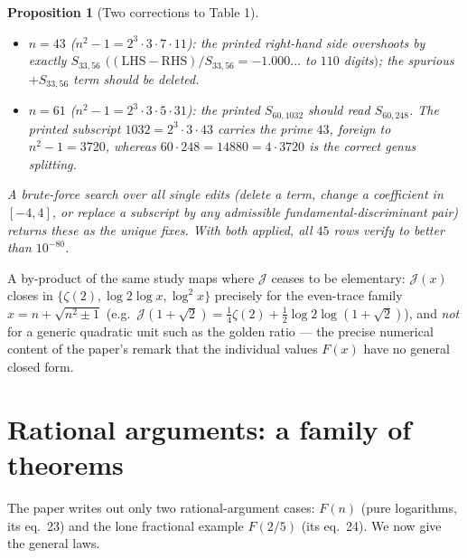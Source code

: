\documentclass[11pt]{article}
\newcommand{\Jcal}{\mathcal{J}}
\theoremstyle{plain}\newtheorem{theorem}{Theorem}\newtheorem{proposition}[theorem]{Proposition}
\theoremstyle{remark}\newtheorem{remark}[theorem]{Remark}
\begin{document}
\begin{proposition}[Two corrections to Table 1]
\leavevmode
\begin{itemize}[topsep=2pt,itemsep=1pt]
\item $n=43$ ($n^2-1=2^3\cdot3\cdot7\cdot11$): the printed right-hand side overshoots by exactly $S_{33,56}$
$\bigl((\text{LHS}-\text{RHS})/S_{33,56}=-1.000\ldots$ to $110$ digits$\bigr)$; the spurious $+S_{33,56}$
term should be deleted.
\item $n=61$ ($n^2-1=2^3\cdot3\cdot5\cdot31$): the printed $S_{60,1032}$ should read $S_{60,248}$. The
printed subscript $1032=2^3\cdot3\cdot43$ carries the prime $43$, foreign to $n^2-1=3720$, whereas
$60\cdot248=14880=4\cdot3720$ is the correct genus splitting.
\end{itemize}
A brute-force search over all single edits (delete a term, change a coefficient in $[-4,4]$, or replace a
subscript by any admissible fundamental-discriminant pair) returns these as the \emph{unique} fixes. With
both applied, all $45$ rows verify to better than $10^{-80}$.
\end{proposition}

\noindent A by-product of the same study maps where $\Jcal$ ceases to be elementary: $\Jcal(x)$ closes in
$\{\zeta(2),\log2\log x,\log^2 x\}$ precisely for the even-trace family $x=n+\sqrt{n^2\pm1}$
(e.g.\ $\Jcal(1+\sqrt2)=\tfrac14\zeta(2)+\tfrac12\log2\log(1+\sqrt2)$), and \emph{not} for a generic
quadratic unit such as the golden ratio --- the precise numerical content of the paper's remark that the
individual values $F(x)$ have no general closed form.

\section{Rational arguments: a family of theorems}\label{sec:rational}
The paper writes out only two rational-argument cases: $F(n)$ (pure logarithms, its eq.~23) and the lone
fractional example $F(2/5)$ (its eq.~24). We now give the general laws.
\end{document}

